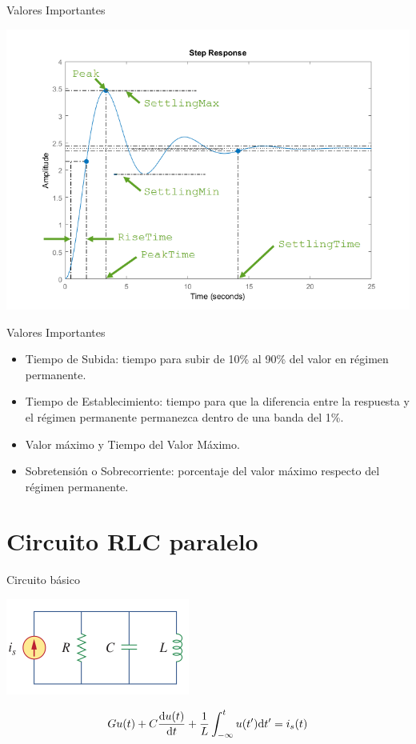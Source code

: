 \documentclass[aspectratio=169, usenames,svgnames,dvipsnames]{beamer}
\begin{document}
\begin{frame}[label={sec:org7865035}]{Valores Importantes}
\begin{center}
\includegraphics[height=0.7\textheight]{../figs/RespuestaEscalon_SegundoOrden.png}
\end{center}
\end{frame}

\begin{frame}[label={sec:org6903ca4}]{Valores Importantes}
\begin{itemize}
\item \alert{Tiempo de Subida}: tiempo para subir de 10\% al 90\% del valor en régimen permanente.

\item \alert{Tiempo de Establecimiento}: tiempo para que la diferencia entre la respuesta y el régimen permanente permanezca dentro de una banda del 1\%.

\item \alert{Valor máximo} y \alert{Tiempo del Valor Máximo}.

\item \alert{Sobretensión} o \alert{Sobrecorriente}: porcentaje del valor máximo respecto del régimen permanente.
\end{itemize}
\end{frame}

\section{Circuito RLC paralelo}
\label{sec:org80397f5}
\begin{frame}[label={sec:orgd92a473}]{Circuito básico}
\begin{center}
\includegraphics[height=0.6\textheight]{../figs/RLC_paralelo.pdf}
\end{center}

\[
  Gu(t) + C\diff{u(t)}{t} + \frac{1}{L}\int_{-\infty}^t u(t') \mathrm{d}t' = i_s(t)
\]
\end{frame}
\end{document}
